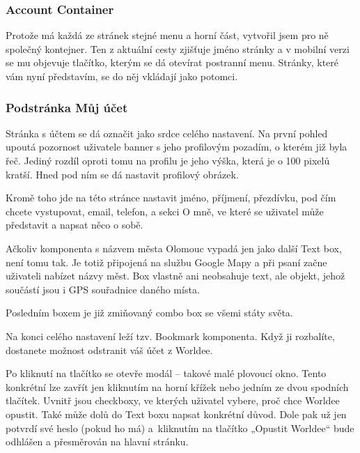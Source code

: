 \subsubsection{Account Container}
Protože má každá ze stránek stejné menu a horní část, vytvořil jsem pro ně společný kontejner. Ten z aktuální cesty zjišťuje jméno stránky 
a v mobilní verzi se mu objevuje tlačítko, kterým se dá otevírat postranní menu. Stránky, které vám nyní představím, se do něj vkládají jako potomci.

\subsubsection{Podstránka Můj účet}
Stránka s účtem se dá označit jako srdce celého nastavení. Na první pohled upoutá pozornost uživatele banner s jeho profilovým pozadím, o kterém již byla řeč. Jediný rozdíl oproti tomu na profilu je jeho výška, která je o 100 pixelů kratší. Hned pod ním se dá nastavit profilový obrázek.

Kromě toho jde na této stránce nastavit jméno, příjmení, přezdívku, pod čím chcete vystupovat, email, telefon, a sekci O mně, ve které se uživatel může představit a napsat něco o sobě.

Ačkoliv komponenta s názvem města Olomouc vypadá jen jako další Text box, není tomu tak. Je totiž připojená na službu Google Mapy a při psaní začne uživateli nabízet názvy měst. Box vlastně ani neobsahuje text, ale objekt, jehož součástí jsou i GPS souřadnice daného místa.

Posledním boxem je již zmiňovaný combo box se všemi státy světa.

Na konci celého nastavení leží tzv. Bookmark komponenta. Když ji rozbalíte, dostanete možnost odstranit váš účet z Worldee.

Po kliknutí na tlačítko se otevře modál – takové malé plovoucí okno. Tento konkrétní lze zavřít jen kliknutím na horní křížek nebo jedním ze dvou spodních tlačítek. Uvnitř jsou checkboxy, ve kterých uživatel vybere, proč chce Worldee opustit. Také může dolů do Text boxu napsat konkrétní důvod. Dole pak už jen potvrdí své heslo (pokud ho má) a~kliknutím na tlačítko „Opustit Worldee“ bude odhlášen a přesměrován na hlavní stránku.

